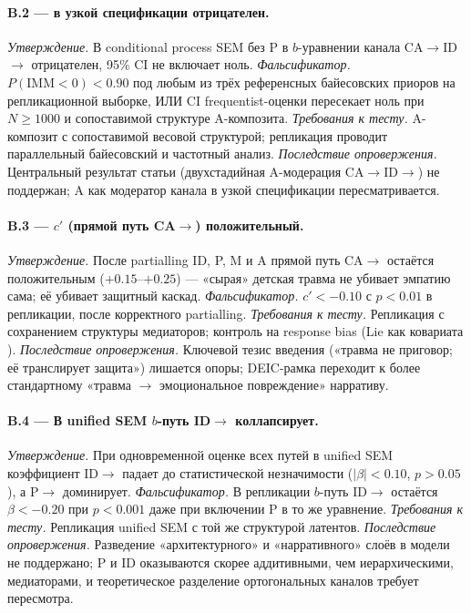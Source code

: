 \paragraph{B.2 --- \IMM{} в узкой спецификации отрицателен.}
\emph{Утверждение.} В conditional process SEM без P в $b$-уравнении \IMM{} канала CA$\to$ID$\to$\EAF{} отрицателен, 95\% CI не включает ноль.
\emph{Фальсификатор.} $P(\mathrm{IMM} < 0) < 0.90$ под любым из трёх референсных байесовских приоров на репликационной выборке, ИЛИ CI frequentist-оценки пересекает ноль при $N \geq 1000$ и сопоставимой структуре A-композита.
\emph{Требования к тесту.} A-композит с сопоставимой весовой структурой; репликация проводит параллельный байесовский и частотный анализ.
\emph{Последствие опровержения.} Центральный результат статьи (двухстадийная A-модерация CA$\to$ID$\to$\EAF) не поддержан; A как модератор канала в узкой спецификации пересматривается.

\paragraph{B.3 --- $c'$ (прямой путь CA$\to$\EAF{}) положительный.}
\emph{Утверждение.} После partialling ID, P, M и A прямой путь CA$\to$\EAF{} остаётся положительным ($+0.15$--$+0.25$) --- «сырая» детская травма не убивает эмпатию сама; её убивает защитный каскад.
\emph{Фальсификатор.} $c' < -0.10$ с $p < 0.01$ в репликации, после корректного partialling.
\emph{Требования к тесту.} Репликация с сохранением структуры медиаторов; контроль на response bias (Lie как ковариата \EAF).
\emph{Последствие опровержения.} Ключевой тезис введения («травма не приговор; её транслирует защита») лишается опоры; DEIC-рамка переходит к более стандартному «травма $\to$ эмоциональное повреждение» нарративу.

\paragraph{B.4 --- В unified SEM $b$-путь ID$\to$\EAF{} коллапсирует.}
\emph{Утверждение.} При одновременной оценке всех путей в unified SEM коэффициент ID$\to$\EAF{} падает до статистической незначимости ($|\beta| < 0.10$, $p > 0.05$), а P$\to$\EAF{} доминирует.
\emph{Фальсификатор.} В репликации $b$-путь ID$\to$\EAF{} остаётся $\beta < -0.20$ при $p < 0.001$ даже при включении P в то же уравнение.
\emph{Требования к тесту.} Репликация unified SEM с той же структурой латентов.
\emph{Последствие опровержения.} Разведение «архитектурного» и «нарративного» слоёв в модели \EAF{} не поддержано; P и ID оказываются скорее аддитивными, чем иерархическими, медиаторами, и теоретическое разделение ортогональных каналов требует пересмотра.

